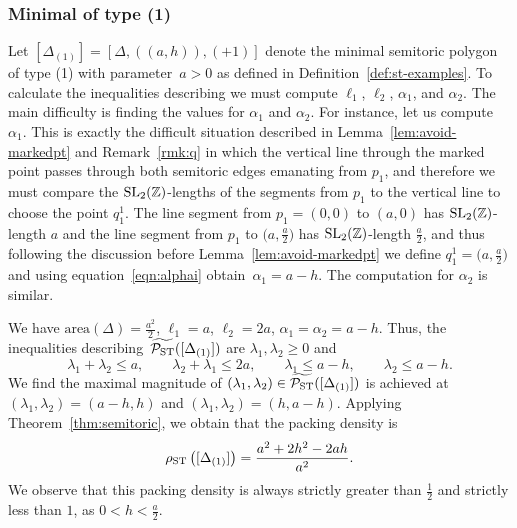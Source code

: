 \documentclass[10pt,a4paper]{amsart}
\numberwithin{equation}{section}
\def\Z{{\mathbb Z}}
\newcommand{\De}{\Delta}
\newcommand{\PSTtilde}{\widetilde{\mathcal{P}_{\rm ST}}}
\newcommand{\SL}{{\rm SL}_2(\Z)}
\theoremstyle{definition}
\theoremstyle{plain}
\theoremstyle{plain}
\begin{document}
\subsubsection{Minimal of type (1)}
\label{sec:type1-packing}
Let $[\De_{(1)}] = [\De,((a,h)),(+1)]$ denote the minimal semitoric polygon of type (1) with parameter~$a>0$ as defined in Definition~\ref{def:st-examples}.
To calculate the inequalities describing \smash{$\PSTtilde([\De_{(1)}])$} we must compute $\ell_1$, $\ell_2$, $\alpha_1$, and $\alpha_2$.
The main difficulty is finding the values for $\alpha_1$ and $\alpha_2$. For instance, let us compute $\alpha_1$.
This is exactly the difficult situation described in Lemma~\ref{lem:avoid-markedpt} and Remark~\ref{rmk:q} in which the vertical line through the marked point passes through both semitoric edges emanating from $p_1$, and therefore we must compare the $\SL$-lengths of the segments from $p_1$ to the vertical line to choose the point $q_1^1$.
The line segment from $p_1=(0,0)$ to $(a,0)$ has $\SL$-length $a$ and the line segment from $p_1$ to $\big(a,\frac{a}{2}\big)$ has $\SL$-length $\frac{a}{2}$, and thus following the discussion before Lemma~\ref{lem:avoid-markedpt} we define $q_1^1 = \big(a,\frac{a}{2}\big)$ and using equation~\eqref{eqn:alphai} obtain~$\alpha_1 = a-h$.
The computation for $\alpha_2$ is similar.


We have $\textrm{area}(\De) = \frac{a^2}{2}$, $\ell_1 = a$, $\ell_2 = 2a$, $\alpha_1 = \alpha_2 = a-h$. Thus, the inequalities describing~$\PSTtilde([\De_{(1)}])$ are $\lambda_1,\lambda_2\geq 0$ and
\begin{equation*}
\lambda_1+\lambda_2 \leq a,\qquad
 \lambda_2+\lambda_1 \leq 2a,\qquad
 \lambda_1 \leq a-h,\qquad
 \lambda_2 \leq a-h.
\end{equation*}
We find the maximal magnitude of $(\lambda_1,\lambda_2)\in\PSTtilde([\De_{(1)}])$ is achieved at $(\lambda_1,\lambda_2) = (a-h,h)$ and $(\lambda_1,\lambda_2) = (h,a-h)$.
Applying Theorem~\ref{thm:semitoric}, we obtain that the packing density is
\begin{equation}\label{eqn:stpack-1}
\rho_{{\rm ST}} \left([\De_{(1)}]\right) = \frac{a^2+2h^2-2ah}{a^2}.
\end{equation}
We observe that this packing density is always strictly greater than $\frac{1}{2}$ and strictly less than $1$, as $0< h < \frac{a}{2}$.
\end{document}
